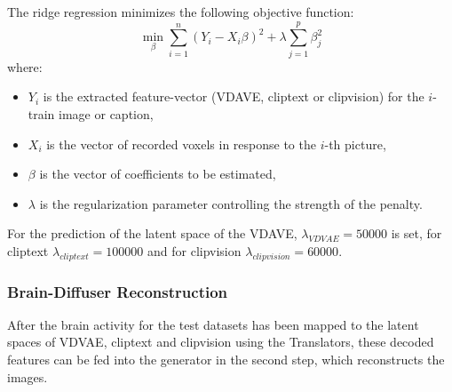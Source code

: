 The ridge regression minimizes the following objective function:
\[
\min_{\beta} \sum_{i=1}^{n} {(Y_i - X_i \beta)}^2 + \lambda \sum_{j=1}^{p} \beta_j^2
\]
where:
\begin{itemize}
    \item \(Y_i\) is the extracted feature-vector (VDAVE, cliptext or clipvision) for the \(i\)-train image or caption,
    \item \(X_i\) is the vector of recorded voxels in response to the \(i\)-th picture,
    \item \(\beta\) is the vector of coefficients to be estimated,
    \item \(\lambda\) is the regularization parameter controlling the strength of the penalty.
\end{itemize}

For the prediction of the latent space of the VDAVE, $\lambda_{VDVAE}=50000$ is set, for cliptext $\lambda_{cliptext}=100000$ and for clipvision $\lambda_{clipvision}=60000$. 

        

\subsubsection{Brain-Diffuser Reconstruction}
After the brain activity for the test datasets has been mapped to the latent spaces of VDVAE, cliptext and clipvision using the Translators, these decoded features can be fed into the generator in the second step, which reconstructs the images.

